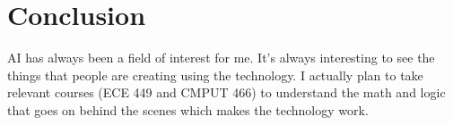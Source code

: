 \documentclass[letterpaper,12pt]{article}
\begin{document}
\section{Conclusion}

AI has always been a field of interest for me.
It's always interesting to see the things that people are creating
using the technology. I actually plan to take relevant courses (ECE 449 and CMPUT 466)
to understand the math and logic that goes on behind the scenes
which makes the technology work.


\singlespacing
\nocite{*}
\printbibliography
% 
% 
\end{document}
